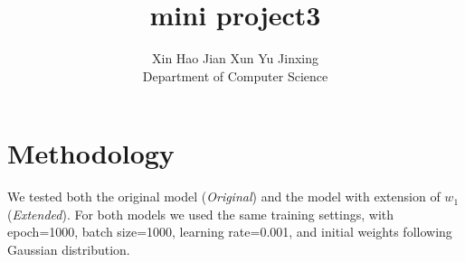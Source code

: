 \documentclass{article}
\title{mini project3}
\author{
  Xin Hao \quad Jian Xun \quad Yu Jinxing \\
  Department of Computer Science\\
}
\begin{document}

\maketitle



\section{Methodology}
We tested both the original model (\textit{Original}) and the model with extension of $w_1$ (\textit{Extended}). For both models we used the same training settings, with epoch=1000, batch size=1000, learning rate=0.001, and initial weights following Gaussian distribution.
%


\end{document}
